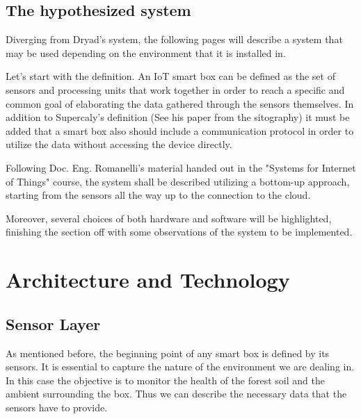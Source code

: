 \documentclass[11pt]{article}
\begin{document}
\newpage

\subsection{The hypothesized system}
Diverging from Dryad's system, the following pages will describe a system that may be used depending on the environment that it is installed in. \par
\vspace{0.5 cm}

Let's start with the definition. An IoT smart box can be defined as the set of sensors and processing units that work together in order to reach a specific and common goal of elaborating the data gathered through the sensors themselves. In addition to Supercaly's definition (See his paper from the sitography) it must be added that a smart box also should include a communication protocol in order to utilize the data without accessing the device directly. \par
\vspace{0.5 cm}

Following Doc. Eng. Romanelli's material handed out in the "Systems for Internet of Things" course, the system shall be described utilizing a bottom-up approach, starting from the sensors all the way up to the connection to the cloud. \par \vspace{0.5 cm}

Moreover, several choices of both hardware and software will be highlighted, finishing the section off with some observations of the system to be implemented.
\section{Architecture and Technology}
\subsection{Sensor Layer}
As mentioned before, the beginning point of any smart box is defined by its sensors. It is essential to capture the nature of the environment we are dealing in. In this case the objective is to monitor the health of the forest soil and the ambient surrounding the box. Thus we can describe the necessary data that the sensors have to provide.\par
\vspace{0.5 cm}
\end{document}
